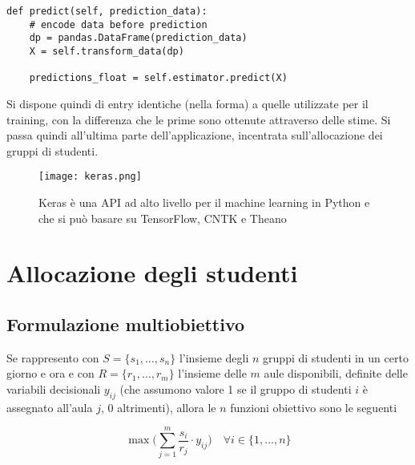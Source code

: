 \begin{verbatim}
def predict(self, prediction_data):
    # encode data before prediction
    dp = pandas.DataFrame(prediction_data)
    X = self.transform_data(dp)

    predictions_float = self.estimator.predict(X)
\end{verbatim} 

Si dispone quindi di entry identiche (nella forma) a quelle utilizzate per il training, con la 
differenza che le prime sono ottenute attraverso delle stime. Si passa quindi all'ultima parte 
dell'applicazione, incentrata sull'allocazione dei gruppi di studenti. 

\begin{figure}
    \begin{small}
        \begin{center}
            \texttt{[image: keras.png]}
        \end{center}
        \caption{Keras è una API ad alto livello per il machine learning in Python
            e che si può basare su TensorFlow, CNTK e Theano \cite{keras}}
        \label{fig:}
    \end{small}
\end{figure}

\newpage

\section{Allocazione degli studenti}
\label{section:methods_allocation}

\subsection{Formulazione multiobiettivo}
\label{section:allocation_formulation}

Se rappresento con $S = \{s_1, \dots, s_n\}$ l'insieme degli $n$  gruppi di studenti in un certo giorno e ora e con 
$R = \{r_1, \dots, r_m\}$ l'insieme
delle $m$  aule disponibili, definite delle variabili decisionali $y_{ij}$ (che assumono valore 1 se il 
gruppo di studenti $i$ è assegnato all'aula $j$, 0 altrimenti), allora le $n$  funzioni obiettivo 
sono le seguenti 

\begin{equation}
    \max \bigg( \sum_{j = 1}^{m}\frac{s_i}{r_j} \cdot y_{ij} \bigg) \quad \forall i \in \{1, \dots, n\}
    \label{eq:objs}
\end{equation}

